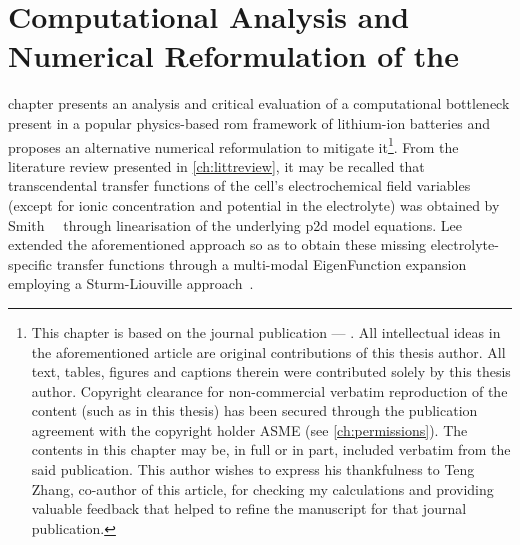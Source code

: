 
\graphicspath{{4/figures/}}

\chapter{Computational Analysis and Numerical Reformulation of the }\label{ch:improveddra}
\startcontents[chapters]

\bigskip

 chapter presents  an analysis and critical  evaluation of a
computational bottleneck present in  a popular physics-based \gls{rom} framework
of lithium-ion batteries and proposes  an alternative numerical reformulation to
mitigate  it\footnote{This  chapter is  based  on  the journal  publication  ---
.  All  intellectual  ideas in  the  aforementioned
article  are original  contributions of  this thesis  author. All  text, tables,
figures  and captions  therein were  contributed solely  by this  thesis author.
Copyright  clearance for  non-commercial  verbatim reproduction  of the  content
(such as in this thesis) has been secured through the publication agreement with
the  copyright holder  ASME (see  \cref{ch:permissions}). The  contents in  this
chapter may be, in full or in part, included verbatim from the said publication.
This  author wishes  to express  his thankfulness  to Teng  Zhang, co-author  of
this  article, for  checking  my calculations  and  providing valuable  feedback
that  helped to  refine  the  manuscript for  that  journal publication.}.  From
the  literature review  presented in  \cref{ch:littreview}, it  may be  recalled
that  transcendental  transfer functions  of  the  cell's electrochemical  field
variables  (except for  ionic concentration  and potential  in the  electrolyte)
was  obtained  by  Smith~\etal~\cite{Smith2007}  through  linearisation  of  the
underlying \gls{p2d} model equations. Lee~\etal~\cite{Lee2012a,Lee2012} extended
the aforementioned approach  so as to obtain  these missing electrolyte-specific
transfer  functions through  a multi-modal  EigenFunction expansion  employing a
Sturm-Liouville approach~\cite{Pryce1993}.


